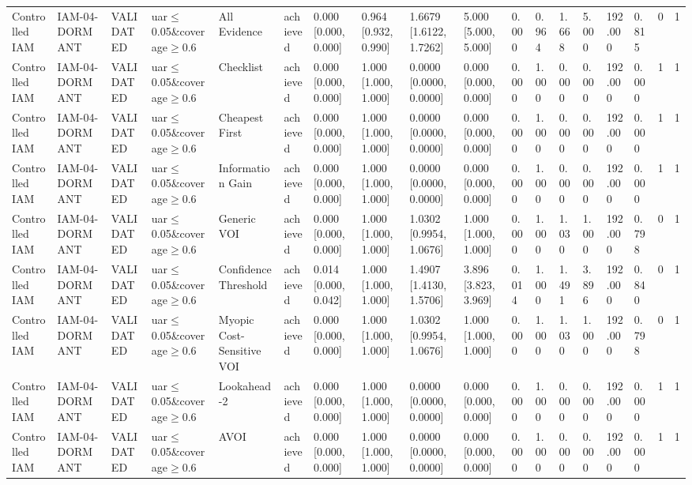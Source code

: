 \begin{table}[!ht]
{\begin{tabular}{llllllllllllllllll}
Controlled IAM & IAM-04-DORMANT & VALIDATED & uar$\le$0.05\&coverage$\ge$0.6 & All Evidence & achieved & 0.000 [0.000, 0.000] & 0.964 [0.932, 0.990] & 1.6679 [1.6122, 1.7262] & 5.000 [5.000, 5.000] & 0.000 & 0.964 & 1.668 & 5.000 & 192.000 & 0.815 & 0 & 1 \\
Controlled IAM & IAM-04-DORMANT & VALIDATED & uar$\le$0.05\&coverage$\ge$0.6 & Checklist & achieved & 0.000 [0.000, 0.000] & 1.000 [1.000, 1.000] & 0.0000 [0.0000, 0.0000] & 0.000 [0.000, 0.000] & 0.000 & 1.000 & 0.000 & 0.000 & 192.000 & 0.000 & 1 & 1 \\
Controlled IAM & IAM-04-DORMANT & VALIDATED & uar$\le$0.05\&coverage$\ge$0.6 & Cheapest First & achieved & 0.000 [0.000, 0.000] & 1.000 [1.000, 1.000] & 0.0000 [0.0000, 0.0000] & 0.000 [0.000, 0.000] & 0.000 & 1.000 & 0.000 & 0.000 & 192.000 & 0.000 & 1 & 1 \\
Controlled IAM & IAM-04-DORMANT & VALIDATED & uar$\le$0.05\&coverage$\ge$0.6 & Information Gain & achieved & 0.000 [0.000, 0.000] & 1.000 [1.000, 1.000] & 0.0000 [0.0000, 0.0000] & 0.000 [0.000, 0.000] & 0.000 & 1.000 & 0.000 & 0.000 & 192.000 & 0.000 & 1 & 1 \\
Controlled IAM & IAM-04-DORMANT & VALIDATED & uar$\le$0.05\&coverage$\ge$0.6 & Generic VOI & achieved & 0.000 [0.000, 0.000] & 1.000 [1.000, 1.000] & 1.0302 [0.9954, 1.0676] & 1.000 [1.000, 1.000] & 0.000 & 1.000 & 1.030 & 1.000 & 192.000 & 0.798 & 0 & 1 \\
Controlled IAM & IAM-04-DORMANT & VALIDATED & uar$\le$0.05\&coverage$\ge$0.6 & Confidence Threshold & achieved & 0.014 [0.000, 0.042] & 1.000 [1.000, 1.000] & 1.4907 [1.4130, 1.5706] & 3.896 [3.823, 3.969] & 0.014 & 1.000 & 1.491 & 3.896 & 192.000 & 0.840 & 0 & 1 \\
Controlled IAM & IAM-04-DORMANT & VALIDATED & uar$\le$0.05\&coverage$\ge$0.6 & Myopic Cost-Sensitive VOI & achieved & 0.000 [0.000, 0.000] & 1.000 [1.000, 1.000] & 1.0302 [0.9954, 1.0676] & 1.000 [1.000, 1.000] & 0.000 & 1.000 & 1.030 & 1.000 & 192.000 & 0.798 & 0 & 1 \\
Controlled IAM & IAM-04-DORMANT & VALIDATED & uar$\le$0.05\&coverage$\ge$0.6 & Lookahead-2 & achieved & 0.000 [0.000, 0.000] & 1.000 [1.000, 1.000] & 0.0000 [0.0000, 0.0000] & 0.000 [0.000, 0.000] & 0.000 & 1.000 & 0.000 & 0.000 & 192.000 & 0.000 & 1 & 1 \\
Controlled IAM & IAM-04-DORMANT & VALIDATED & uar$\le$0.05\&coverage$\ge$0.6 & AVOI & achieved & 0.000 [0.000, 0.000] & 1.000 [1.000, 1.000] & 0.0000 [0.0000, 0.0000] & 0.000 [0.000, 0.000] & 0.000 & 1.000 & 0.000 & 0.000 & 192.000 & 0.000 & 1 & 1 \\

\end{tabular}}
\end{table}
